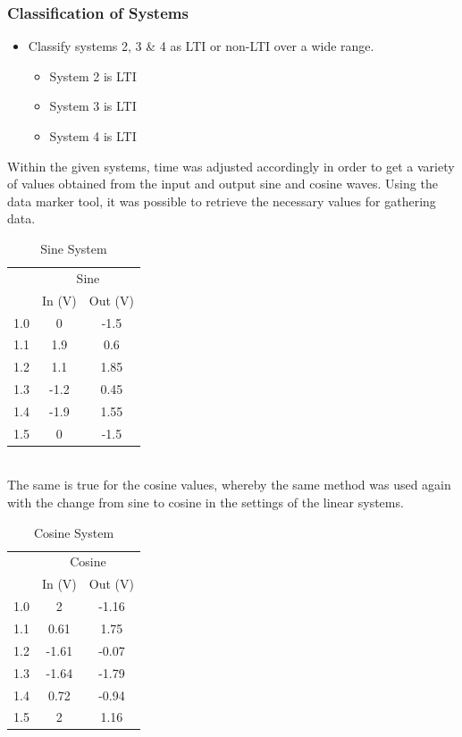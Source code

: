 \documentclass[12pt]{article}
\begin{document}
\subsubsection{Classification of Systems}
\begin{itemize}
\item Classify systems 2, 3 \& 4 as LTI or non-LTI over a wide range.
\begin{itemize}
\item System 2 is LTI
\item System 3 is LTI
\item System 4 is LTI
\end{itemize}
\end{itemize}
Within the given systems, time was adjusted accordingly in order to get a variety of values obtained from the input and output sine and cosine waves. Using the data marker tool, it was possible to retrieve the necessary values for gathering data.
\begin{table}[h]
\centering
\begin{tabular}{ccc}
    & \multicolumn{2}{c}{Sine} \\
    & In (V)          & Out (V)        \\
1.0 & 0           & -1.5       \\
1.1 & 1.9         & 0.6        \\
1.2 & 1.1         & 1.85       \\
1.3 & -1.2        & 0.45       \\
1.4 & -1.9        & 1.55       \\
1.5 & 0           & -1.5      
\end{tabular}
\caption{Sine System}
\end{table}\\
The same is true for the cosine values, whereby the same method was used again with the change from sine to cosine in the settings of the linear systems.\\
\begin{table}[h]
\centering
\begin{tabular}{ccc}
    & \multicolumn{2}{c}{Cosine} \\
    & In (V)          & Out (V)        \\
1.0 & 2           & -1.16       \\
1.1 & 0.61         & 1.75        \\
1.2 & -1.61         & -0.07       \\
1.3 & -1.64        & -1.79       \\
1.4 & 0.72        & -0.94       \\
1.5 & 2           & 1.16      
\end{tabular}
\caption{Cosine System}
\end{table}\clearpage
\end{document}
